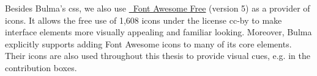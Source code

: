 \documentclass[\relativeRoot/main.tex]{subfiles}
\begin{document}
Besides Bulma's \acrshort{css}, we also use \href{https://fontawesome.com}{~Font Awesome Free} (version 5) \cite{noauthor_font_2022} as a provider of icons. It allows the free use of 1,608 icons under the license  \gls{cc-by} to make interface elements more visually appealing and familiar looking. Moreover, Bulma explicitly supports adding Font Awesome icons to many of its core elements. Their icons are also used throughout this thesis to provide visual cues, e.g. in the contribution boxes.
\end{document}
